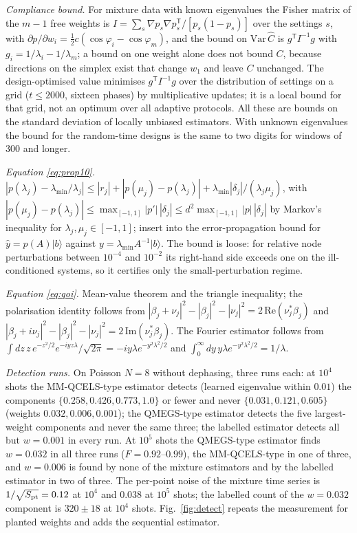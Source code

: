 \documentclass[journal]{IEEEtran}
\newcommand{\lmin}{\lambda_{\min}}
\begin{document}
\emph{Compliance bound.} For mixture data with known eigenvalues the Fisher matrix of the $m-1$ free weights is $I=\sum_s\nabla p_s\nabla p_s^{\mathsf T}/[p_s(1-p_s)]$ over the settings $s$, with $\partial p/\partial w_i=\tfrac12c(\cos\varphi_i-\cos\varphi_m)$, and the bound on $\mathrm{Var}\,\hat C$ is $g^{\mathsf T}I^{-1}g$ with $g_i=1/\lambda_i-1/\lambda_m$; a bound on one weight alone does not bound $C$, because directions on the simplex exist that change $w_1$ and leave $C$ unchanged. The design-optimised value minimises $g^{\mathsf T}I^{-1}g$ over the distribution of settings on a grid ($t\le2000$, sixteen phases) by multiplicative updates; it is a local bound for that grid, not an optimum over all adaptive protocols. All these are bounds on the standard deviation of locally unbiased estimators. With unknown eigenvalues the bound for the random-time designs is the same to two digits for windows of $300$ and longer.

\emph{Equation \eqref{eq:prop10}.} $|p(\lambda_j)-\lmin/\lambda_j|\le|r_j|+|p(\mu_j)-p(\lambda_j)|+\lmin|\delta_j|/(\lambda_j\mu_j)$, with $|p(\mu_j)-p(\lambda_j)|\le\max_{[-1,1]}|p'|\,|\delta_j|\le d^2\max_{[-1,1]}|p|\,|\delta_j|$ by Markov's inequality for $\lambda_j,\mu_j\in[-1,1]$; insert into the error-propagation bound for $\hat y=p(A)|b\rangle$ against $y=\lmin A^{-1}|b\rangle$. The bound is loose: for relative node perturbations between $10^{-4}$ and $10^{-2}$ its right-hand side exceeds one on the ill-conditioned systems, so it certifies only the small-perturbation regime.

\emph{Equation \eqref{eq:qoi}.} Mean-value theorem and the triangle inequality; the polarisation identity follows from $|\beta_j+\nu_j|^2-|\beta_j|^2-|\nu_j|^2=2\,\mathrm{Re}(\nu_j^*\beta_j)$ and $|\beta_j+i\nu_j|^2-|\beta_j|^2-|\nu_j|^2=2\,\mathrm{Im}(\nu_j^*\beta_j)$. The Fourier estimator follows from $\int dz\,z\,e^{-z^2/2}e^{-iyz\lambda}/\sqrt{2\pi}=-iy\lambda e^{-y^2\lambda^2/2}$ and $\int_0^\infty dy\,y\lambda e^{-y^2\lambda^2/2}=1/\lambda$.

\emph{Detection runs.} On Poisson $N=8$ without dephasing, three runs each: at $10^4$ shots the MM-QCELS-type estimator detects (learned eigenvalue within $0.01$) the components $\{0.258,0.426,0.773,1.0\}$ or fewer and never $\{0.031,0.121,0.605\}$ (weights $0.032,0.006,0.001$); the QMEGS-type estimator detects the five largest-weight components and never the same three; the labelled estimator detects all but $w=0.001$ in every run. At $10^5$ shots the QMEGS-type estimator finds $w=0.032$ in all three runs ($F=0.92$--$0.99$), the MM-QCELS-type in one of three, and $w=0.006$ is found by none of the mixture estimators and by the labelled estimator in two of three. The per-point noise of the mixture time series is $1/\sqrt{S_{\rm pt}}=0.12$ at $10^4$ and $0.038$ at $10^5$ shots; the labelled count of the $w=0.032$ component is $320\pm18$ at $10^4$ shots. Fig.~\ref{fig:detect} repeats the measurement for planted weights and adds the sequential estimator.
\end{document}
